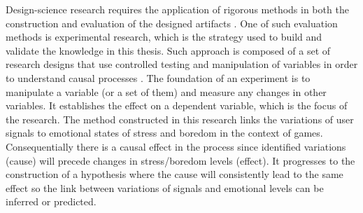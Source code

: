 
Design-science research requires the application of rigorous methods in both the construction and evaluation of the designed artifacts \parencite{hevner2004design, johannesson2014introduction, oates2005researching}. One of such evaluation methods is experimental research, which is the strategy used to build and validate the knowledge in this thesis. Such approach is composed of a set of research designs that use controlled testing and manipulation of variables in order to understand causal processes \parencite{robson2016real}. The foundation of an experiment is to manipulate a variable (or a set of them) and measure any changes in other variables. It establishes the effect on a dependent variable, which is the focus of the research. The method constructed in this research links the variations of user signals to emotional states of stress and boredom in the context of games. Consequentially there is a causal effect in the process since identified variations (cause) will precede changes in stress/boredom levels (effect). It progresses to the construction of a hypothesis where the cause will consistently lead to the same effect so the link between variations of signals and emotional levels can be inferred or predicted.

